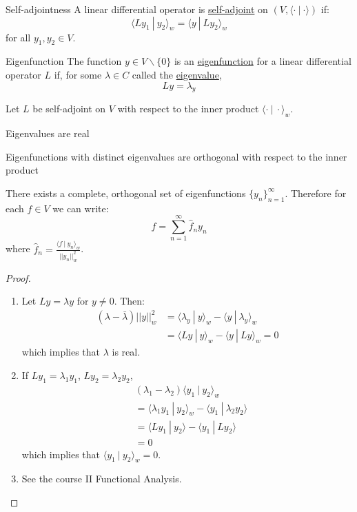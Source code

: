 \documentclass[../Main.tex]{subfiles}
\begin{document}
\begin{definition}{Self-adjointness}
    A linear differential operator is \underline{self-adjoint} on $(V, \langle \cdot~|~\cdot\rangle)$ if:
    \begin{equation*}
        \langle Ly_1~|~y_2\rangle_w = \langle y~|~Ly_2\rangle_w
    \end{equation*}
    for all $y_1, y_2 \in V$.
\end{definition}
\begin{definition}{Eigenfunction}
    The function $y \in V \backslash \{0\}$ is an \underline{eigenfunction} for a linear differential operator $L$ if, for some $\lambda \in C$ called the \underline{eigenvalue},
    \begin{equation}
        Ly = \lambda_y
        \label{eqnEigenFunc}
    \end{equation}
\end{definition}
\begin{propositions}{
        Let $L$ be self-adjoint on $V$ with respect to the inner product $\langle \cdot~|~\cdot\rangle_w$.
        \label{propsSelfAdjProps}
    }
    \item Eigenvalues are real
    \item Eigenfunctions with distinct eigenvalues are orthogonal with respect to the inner product
    \item There exists a complete, orthogonal set of eigenfunctions $\{y_n\}_{n=1}^\infty$. Therefore for each $f \in V$ we can write:
        \begin{equation*}
            f = \sum_{n = 1}^\infty \hat{f}_n y_n
        \end{equation*}
        where $\hat{f}_n = \frac{\langle f~|~y_n\rangle_w}{||y_n||_w^2}$.
\end{propositions}
\begin{proof}
    \begin{enumerate}
        \item Let $Ly = \lambda y$ for $y \neq 0$. Then:
            \begin{align*}
                (\lambda - \bar{\lambda}) ||y||_w^2 &= \langle \lambda_y~|~y\rangle_w - \langle y~|~\lambda_y\rangle_w \\
                &= \langle Ly~|~y\rangle_w - \langle y~|~Ly\rangle_w = 0
            \end{align*}
            which implies that $\lambda$ is real.
        \item If $Ly_1 = \lambda_1 y_1$, $Ly_2 = \lambda_2 y_2$,
            \begin{align*}
                &(\lambda_1 - \lambda_2) \langle y_1~|~y_2\rangle_w \\
                &= \langle \lambda_1 y_1~|~y_2\rangle_w - \langle y_1~|~\lambda_2 y_2\rangle \\
                &= \langle Ly_1~|~y_2\rangle - \langle y_1~|~Ly_2\rangle \\
                &= 0
            \end{align*}
            which implies that $\langle y_1~|~y_2\rangle_w = 0$.
        \item See the course II Functional Analysis.
    \end{enumerate}
\end{proof}
\end{document}
